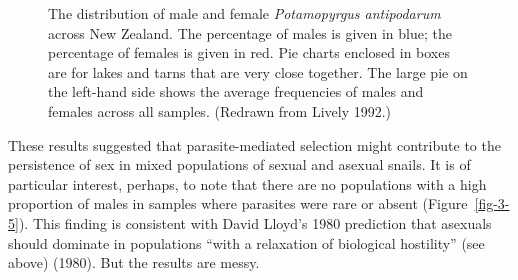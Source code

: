 \documentclass[
  letterpaper,
]{book}
\begin{document}
\begin{figure}


\caption[Distribution of male and female \emph{Potamopyrgus antipodarum}
across New Zealand]{\label{fig-3-6}The distribution of male and female
\emph{Potamopyrgus antipodarum} across New Zealand. The percentage of
males is given in blue; the percentage of females is given in red. Pie
charts enclosed in boxes are for lakes and tarns that are very close
together. The large pie on the left-hand side shows the average
frequencies of males and females across all samples. (Redrawn from
Lively 1992.)}

\end{figure}%

These results suggested that parasite-mediated selection might
contribute to the persistence of sex in mixed populations of sexual and
asexual snails. It is of particular interest, perhaps, to note that
there are no populations with a high proportion of males in samples
where parasites were rare or absent (Figure~\ref{fig-3-5}). This finding
is consistent with David Lloyd's 1980 prediction that asexuals should
dominate in populations ``with a relaxation of biological hostility''
(see above) (1980). But the results are messy.
\end{document}
